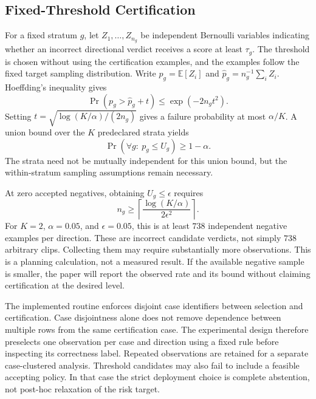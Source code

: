 \subsection{Fixed-Threshold Certification}

For a fixed stratum $g$, let $Z_1,\ldots,Z_{n_g}$ be independent Bernoulli
variables indicating whether an incorrect directional verdict receives a
score at least $\tau_g$. The threshold is chosen without using the
certification examples, and the examples follow the fixed target sampling
distribution. Write $p_g=\mathbb E[Z_i]$ and
$\widehat p_g=n_g^{-1}\sum_i Z_i$. Hoeffding's inequality gives
\begin{equation}
 \Pr\left(p_g>\widehat p_g+t\right)\leq\exp(-2n_gt^2).
\end{equation}
Setting $t=\sqrt{\log(K/\alpha)/(2n_g)}$ gives a failure probability at most
$\alpha/K$. A union bound over the $K$ predeclared strata yields
\begin{equation}
 \Pr\left(\forall g:\ p_g\leq U_g\right)\geq1-\alpha.
\end{equation}
The strata need not be mutually independent for this union bound, but the
within-stratum sampling assumptions remain necessary.

At zero accepted negatives, obtaining $U_g\leq\epsilon$ requires
\begin{equation}
 n_g\geq\left\lceil\frac{\log(K/\alpha)}{2\epsilon^2}\right\rceil.
 \label{eq:calibration-sample-size}
\end{equation}
For $K=2$, $\alpha=0.05$, and $\epsilon=0.05$, this is at least $738$
independent negative examples per direction. These are incorrect candidate
verdicts, not simply $738$ arbitrary clips. Collecting them may require
substantially more observations. This is a planning calculation, not a
measured result. If the available negative sample is smaller, the paper will
report the observed rate and its bound without claiming certification at
the desired level.

The implemented routine enforces disjoint case identifiers between
selection and certification. Case disjointness alone does not remove
dependence between multiple rows from the same certification case. The
experimental design therefore preselects one observation per case and
direction using a fixed rule before inspecting its correctness label.
Repeated observations are retained for a separate case-clustered analysis.
Threshold candidates may also fail to include a feasible accepting policy.
In that case the strict deployment choice is complete abstention, not
post-hoc relaxation of the risk target.

